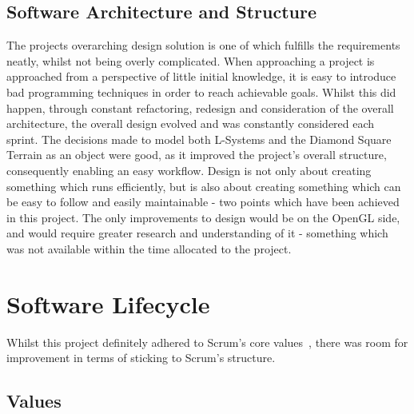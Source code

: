 \documentclass[a4paper,10pt]{report}
\begin{document}
\subsection{Software Architecture and Structure}

The projects overarching design solution is one of which fulfills the requirements neatly, whilst not being overly complicated. When approaching a project is approached from a perspective of little initial knowledge, it is easy to introduce bad programming techniques in order to reach achievable goals. Whilst this did happen, through constant refactoring, redesign and consideration of the overall architecture, the overall design evolved and was constantly considered each sprint. The decisions made to model both L-Systems and the Diamond Square Terrain as an object were good, as it improved the project's overall structure, consequently enabling an easy workflow. Design is not only about creating something which runs efficiently, but is also about creating something which can be easy to follow and easily maintainable - two points which have been achieved in this project. The only improvements to design would be on the OpenGL side, and would require greater research and understanding of it - something which was not available within the time allocated to the project.
    
    
\section{Software Lifecycle}

Whilst this project definitely adhered to Scrum's core values~\cite{alliance2008scrum}, there was room for improvement in terms of sticking to Scrum's structure.

\subsection{Values}
\end{document}
